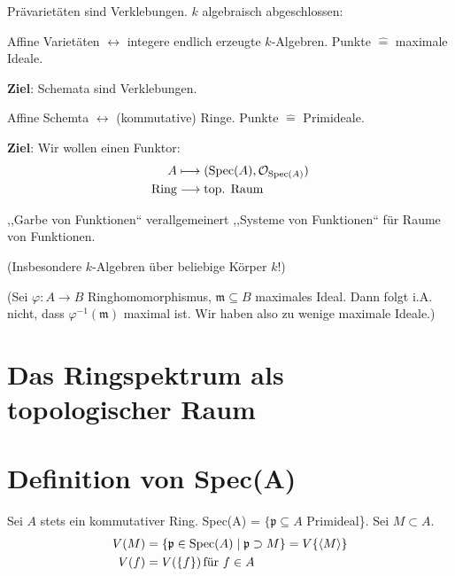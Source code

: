 Prävarietäten sind Verklebungen. $k$ algebraisch abgeschlossen:

Affine Varietäten $\leftrightarrow$ integere endlich erzeugte
$k$-Algebren.  Punkte $\hat{=}$ maximale Ideale.

\textbf{Ziel}: Schemata sind Verklebungen.

Affine Schemta $\leftrightarrow$ (kommutative) Ringe. Punkte $\hat{=}$
Primideale.

\textbf{Ziel}: Wir wollen einen Funktor:
\begin{align*}
  A & \longmapsto(\operatorname{Spec}(A),\mathcal{O}_{\operatorname{Spec}(A)})\\
  \text{Ring} & \longrightarrow\text{top. Raum}
\end{align*}

,,Garbe von Funktionen`` verallgemeinert ,,Systeme von Funktionen``
für Raume von Funktionen.

(Insbesondere $k$-Algebren über beliebige Körper $k$!)

(Sei $\varphi:A\rightarrow B$ Ringhomomorphismus,
$\mathfrak{m}\subseteq B$ maximales Ideal. Dann folgt i.A. nicht, dass
$\varphi^{-1}(\mathfrak{m})$ maximal ist. Wir haben also zu wenige
maximale Ideale.)

\section*{Das Ringspektrum als topologischer Raum}

\section{Definition von Spec(A)}

Sei $A$ stets ein kommutativer Ring. Spec(A) =
$\{\mathfrak{p}\subseteq A$ Primideal\}. Sei $M\subset A$.
\begin{align*}
  V(M) & =\{\mathfrak{p}\in\operatorname{Spec}(A)\mid\mathfrak{p}\supset
         M\}=V\{\langle M\rangle\}\\
  V(f) & =V(\{f\})\text{\,für }f\in A
\end{align*}

